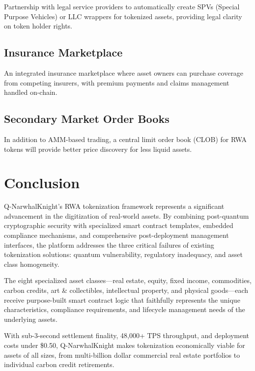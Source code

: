 \documentclass[11pt,a4paper,twoside]{article}
\begin{document}
Partnership with legal service providers to automatically create SPVs (Special Purpose Vehicles) or LLC wrappers for tokenized assets, providing legal clarity on token holder rights.

\subsection{Insurance Marketplace}

An integrated insurance marketplace where asset owners can purchase coverage from competing insurers, with premium payments and claims management handled on-chain.

\subsection{Secondary Market Order Books}

In addition to AMM-based trading, a central limit order book (CLOB) for RWA tokens will provide better price discovery for less liquid assets.

\section{Conclusion}
\label{sec:conclusion}

Q-NarwhalKnight's RWA tokenization framework represents a significant advancement in the digitization of real-world assets. By combining post-quantum cryptographic security with specialized smart contract templates, embedded compliance mechanisms, and comprehensive post-deployment management interfaces, the platform addresses the three critical failures of existing tokenization solutions: quantum vulnerability, regulatory inadequacy, and asset class homogeneity.

The eight specialized asset classes---real estate, equity, fixed income, commodities, carbon credits, art \& collectibles, intellectual property, and physical goods---each receive purpose-built smart contract logic that faithfully represents the unique characteristics, compliance requirements, and lifecycle management needs of the underlying assets.

With sub-3-second settlement finality, 48,000+ TPS throughput, and deployment costs under \$0.50, Q-NarwhalKnight makes tokenization economically viable for assets of all sizes, from multi-billion dollar commercial real estate portfolios to individual carbon credit retirements.
\end{document}
